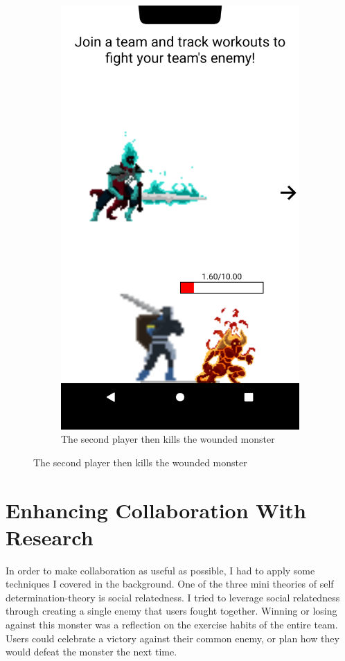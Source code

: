 \documentclass{l4proj}
\begin{document}
\begin{figure}[H]
\begin{subfigure}{0.45\textwidth}
        \includegraphics[width=\textwidth]{lower_attack.png}
        \caption{The second player then kills the wounded monster} 
    \end{subfigure}
\end{figure}

\section{Enhancing Collaboration With Research} \label{enhancing}
In order to make collaboration as useful as possible, I had to apply some techniques I covered in the background. One of the three mini theories of self determination-theory is social relatedness. I tried to leverage social relatedness through creating a single enemy that users fought together. Winning or losing against this monster was a reflection on the exercise habits of the entire team. Users could celebrate a victory against their common enemy, or plan how they would defeat the monster the next time.
\end{document}

